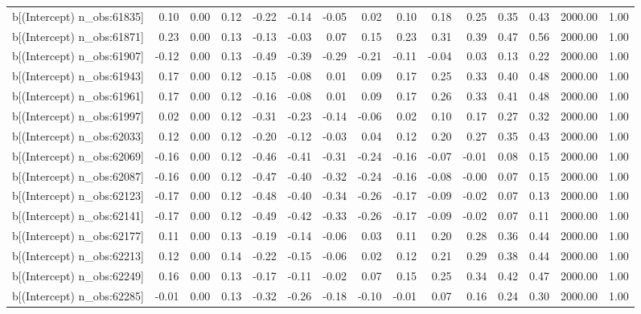 \begin{table}[ht]
\begin{tabular}{rrrrrrrrrrrrrrr}
  b[(Intercept) n\_obs:61835] & 0.10 & 0.00 & 0.12 & -0.22 & -0.14 & -0.05 & 0.02 & 0.10 & 0.18 & 0.25 & 0.35 & 0.43 & 2000.00 & 1.00 \\ 
  b[(Intercept) n\_obs:61871] & 0.23 & 0.00 & 0.13 & -0.13 & -0.03 & 0.07 & 0.15 & 0.23 & 0.31 & 0.39 & 0.47 & 0.56 & 2000.00 & 1.00 \\ 
  b[(Intercept) n\_obs:61907] & -0.12 & 0.00 & 0.13 & -0.49 & -0.39 & -0.29 & -0.21 & -0.11 & -0.04 & 0.03 & 0.13 & 0.22 & 2000.00 & 1.00 \\ 
  b[(Intercept) n\_obs:61943] & 0.17 & 0.00 & 0.12 & -0.15 & -0.08 & 0.01 & 0.09 & 0.17 & 0.25 & 0.33 & 0.40 & 0.48 & 2000.00 & 1.00 \\ 
  b[(Intercept) n\_obs:61961] & 0.17 & 0.00 & 0.12 & -0.16 & -0.08 & 0.01 & 0.09 & 0.17 & 0.26 & 0.33 & 0.41 & 0.48 & 2000.00 & 1.00 \\ 
  b[(Intercept) n\_obs:61997] & 0.02 & 0.00 & 0.12 & -0.31 & -0.23 & -0.14 & -0.06 & 0.02 & 0.10 & 0.17 & 0.27 & 0.32 & 2000.00 & 1.00 \\ 
  b[(Intercept) n\_obs:62033] & 0.12 & 0.00 & 0.12 & -0.20 & -0.12 & -0.03 & 0.04 & 0.12 & 0.20 & 0.27 & 0.35 & 0.43 & 2000.00 & 1.00 \\ 
  b[(Intercept) n\_obs:62069] & -0.16 & 0.00 & 0.12 & -0.46 & -0.41 & -0.31 & -0.24 & -0.16 & -0.07 & -0.01 & 0.08 & 0.15 & 2000.00 & 1.00 \\ 
  b[(Intercept) n\_obs:62087] & -0.16 & 0.00 & 0.12 & -0.47 & -0.40 & -0.32 & -0.24 & -0.16 & -0.08 & -0.00 & 0.07 & 0.15 & 2000.00 & 1.00 \\ 
  b[(Intercept) n\_obs:62123] & -0.17 & 0.00 & 0.12 & -0.48 & -0.40 & -0.34 & -0.26 & -0.17 & -0.09 & -0.02 & 0.07 & 0.13 & 2000.00 & 1.00 \\ 
  b[(Intercept) n\_obs:62141] & -0.17 & 0.00 & 0.12 & -0.49 & -0.42 & -0.33 & -0.26 & -0.17 & -0.09 & -0.02 & 0.07 & 0.11 & 2000.00 & 1.00 \\ 
  b[(Intercept) n\_obs:62177] & 0.11 & 0.00 & 0.13 & -0.19 & -0.14 & -0.06 & 0.03 & 0.11 & 0.20 & 0.28 & 0.36 & 0.44 & 2000.00 & 1.00 \\ 
  b[(Intercept) n\_obs:62213] & 0.12 & 0.00 & 0.14 & -0.22 & -0.15 & -0.06 & 0.02 & 0.12 & 0.21 & 0.29 & 0.38 & 0.44 & 2000.00 & 1.00 \\ 
  b[(Intercept) n\_obs:62249] & 0.16 & 0.00 & 0.13 & -0.17 & -0.11 & -0.02 & 0.07 & 0.15 & 0.25 & 0.34 & 0.42 & 0.47 & 2000.00 & 1.00 \\ 
  b[(Intercept) n\_obs:62285] & -0.01 & 0.00 & 0.13 & -0.32 & -0.26 & -0.18 & -0.10 & -0.01 & 0.07 & 0.16 & 0.24 & 0.30 & 2000.00 & 1.00 \\ 

\end{tabular}
\end{table}
